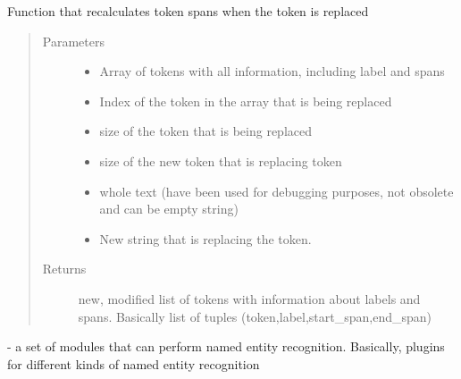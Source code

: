 \documentclass[letterpaper,10pt,english]{sphinxmanual}
\begin{document}
\begin{fulllineitems}
\label{\detokenize{contents:mask_framework.recalculate_tokens}}
Function that recalculates token spans when the token is replaced
\begin{quote}\begin{description}
\item[{Parameters}] \leavevmode\begin{itemize}
\item {} 
 \textendash{} Array of tokens with all information, including label and spans

\item {} 
 \textendash{} Index of the token in the array that is being replaced

\item {} 
 \textendash{} size of the token that is being replaced

\item {} 
 \textendash{} size of the new token that is replacing token

\item {} 
 \textendash{} whole text (have been used for debugging purposes, not obsolete and can be empty string)

\item {} 
 \textendash{} New string that is replacing the token.

\end{itemize}

\item[{Returns}] \leavevmode
new, modified list of tokens with information about labels and spans. Basically list of tuples (token,label,start\_span,end\_span)

\end{description}\end{quote}

\end{fulllineitems}

\label{\detokenize{contents:module-ner_plugins}}
 - a set of modules that can perform named entity recognition. Basically, plugins for different kinds of named entity recognition
\end{document}
